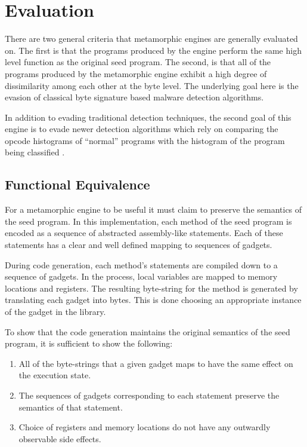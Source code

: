 \chapter{Evaluation}

    There are two general criteria that metamorphic engines are generally
    evaluated on. The first is that the programs produced by the engine
    perform the same high level function as the original seed program. The
    second, is that all of the programs produced by the metamorphic engine
    exhibit a high degree of dissimilarity among each other at the byte
    level. The underlying goal here is the evasion of classical
    byte signature based malware detection algorithms.

    In addition to evading traditional detection techniques, the second goal
    of this engine is to evade newer detection algorithms which rely on
    comparing the opcode histograms of ``normal'' programs with the
    histogram of the program being classified \cite{histogram}.

\section{Functional Equivalence}

    For a metamorphic engine to be useful it must claim to preserve the
    semantics of the seed program. In this implementation, each method of
    the seed program is encoded as a sequence of abstracted assembly-like
    statements. Each of these statements has a clear and well defined
    mapping to sequences of gadgets.
    
    During code generation, each method's statements are compiled down to a
    sequence of gadgets. In the process, local variables are mapped to
    memory locations and registers. The resulting byte-string for the method
    is generated by translating each gadget into bytes. This is done
    choosing an appropriate instance of the gadget in the library.

    To show that the code generation maintains the original semantics of the
    seed program, it is sufficient to show the following:

    \begin{enumerate}

        \item All of the byte-strings that a given gadget maps to have the
            same effect on the execution state.

        \item The sequences of gadgets corresponding to each statement
            preserve the semantics of that statement.

        \item Choice of registers and memory locations do not have any
            outwardly observable side effects.

    \end{enumerate}

